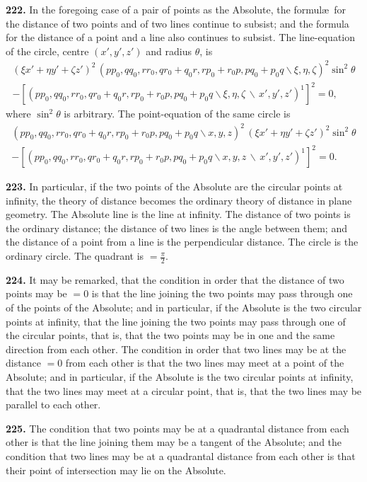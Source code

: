 \documentclass[11pt,a4paper]{article}
\begin{document}
\textbf{222.} In the foregoing case of a pair of points as the Absolute, the formul\ae\ for the
distance of two points and of two lines continue to subsist; and the formula for the
distance of a point and a line also continues to subsist. The line-equation of the
circle, centre $(x',y',z')$ and radius $\theta$, is
\begin{multline*}
(\xi x'+\eta y'+\zeta z')^2\,(pp_0,qq_0,rr_0,qr_0+q_0r,rp_0+r_0p,pq_0+p_0q\!\backslash \xi,\eta,\zeta)^2\sin^2\theta\\
- [(pp_0,qq_0,rr_0,qr_0+q_0r,rp_0+r_0p,pq_0+p_0q\!\backslash \xi,\eta,\zeta\,\backslash\,x',y',z')^1]^2 = 0,
\end{multline*}
where $\sin^2\theta$ is arbitrary. The point-equation of the same circle is
\begin{multline*}
(pp_0,qq_0,rr_0,qr_0+q_0r,rp_0+r_0p,pq_0+p_0q\!\backslash x,y,z)^2\,(\xi x'+\eta y'+\zeta z')^2\sin^2\theta\\
- [(pp_0,qq_0,rr_0,qr_0+q_0r,rp_0+r_0p,pq_0+p_0q\!\backslash x,y,z\,\backslash\,x',y',z')^1]^2 = 0.
\end{multline*}

\textbf{223.} In particular, if the two points of the Absolute are the circular points at
infinity, the theory of distance becomes the ordinary theory of distance in plane
geometry. The Absolute line is the line at infinity. The distance of two points is the
ordinary distance; the distance of two lines is the angle between them; and the distance
of a point from a line is the perpendicular distance. The circle is the ordinary circle.
The quadrant is $=\frac{\pi}{2}$.

\textbf{224.} It may be remarked, that the condition in order that the distance of two
points may be $=0$ is that the line joining the two points may pass through one of the
points of the Absolute; and in particular, if the Absolute is the two circular points at
infinity, that the line joining the two points may pass through one of the circular points,
that is, that the two points may be in one and the same direction from each other. The
condition in order that two lines may be at the distance $=0$ from each other is that
the two lines may meet at a point of the Absolute; and in particular, if the Absolute is
the two circular points at infinity, that the two lines may meet at a circular point, that
is, that the two lines may be parallel to each other.

\textbf{225.} The condition that two points may be at a quadrantal distance from each
other is that the line joining them may be a tangent of the Absolute; and the condition
that two lines may be at a quadrantal distance from each other is that their point of
intersection may lie on the Absolute.
\end{document}
